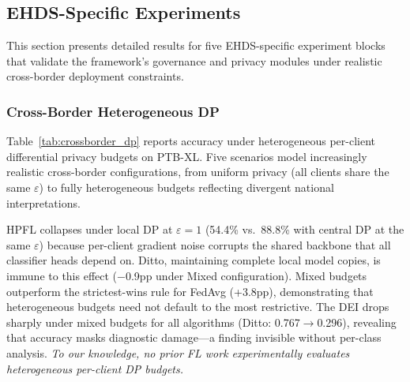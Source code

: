 \documentclass[conference]{IEEEtran}
\begin{document}
\subsection{EHDS-Specific Experiments}
\label{sec:ehds_experiments}

This section presents detailed results for five EHDS-specific experiment blocks that validate the framework's governance and privacy modules under realistic cross-border deployment constraints.

\subsubsection{Cross-Border Heterogeneous DP}
\label{sec:crossborder_dp}

Table~\ref{tab:crossborder_dp} reports accuracy under heterogeneous per-client differential privacy budgets on PTB-XL. Five scenarios model increasingly realistic cross-border configurations, from uniform privacy (all clients share the same $\varepsilon$) to fully heterogeneous budgets reflecting divergent national interpretations.

\begin{table}[htbp]
\centering
\caption{Cross-border heterogeneous DP on PTB-XL (5 clients, 5-class ECG). Per-client local DP with Gaussian mechanism, $C{=}1.0$, $\delta{=}10^{-5}$. Mean $\pm$ std over 3 seeds.}
\label{tab:crossborder_dp}

\vspace{1mm}
\footnotesize{HPFL collapses under local DP at $\varepsilon{=}1$ (54.4\% vs.\ 88.8\% with central DP at the same $\varepsilon$) because per-client gradient noise corrupts the shared backbone that all classifier heads depend on. Ditto, maintaining complete local model copies, is immune to this effect ($-$0.9pp under Mixed configuration). Mixed budgets outperform the strictest-wins rule for FedAvg (+3.8pp), demonstrating that heterogeneous budgets need not default to the most restrictive. The DEI drops sharply under mixed budgets for all algorithms (Ditto: 0.767$\to$0.296), revealing that accuracy masks diagnostic damage---a finding invisible without per-class analysis. \textit{To our knowledge, no prior FL work experimentally evaluates heterogeneous per-client DP budgets.}}
\end{table}
\end{document}
